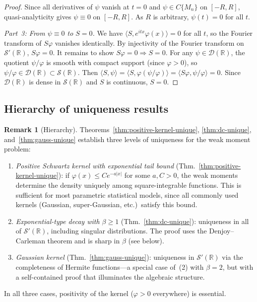 \documentclass[12pt]{article}
\theoremstyle{definition}
\newtheorem{remark}[theorem]{Remark}
\newcommand{\R}{\mathbb{R}}
\begin{document}
\begin{proof}
Since all derivatives of $\psi$ vanish at $t=0$ and $\psi\in C\{M_n\}$ on $[-R,R]$, quasi-analyticity gives $\psi\equiv 0$ on $[-R,R]$.  As $R$ is arbitrary, $\psi(t)=0$ for all $t$.

\medskip
\noindent\textit{Part~3: From $\psi\equiv 0$ to $S = 0$.}
We have $\langle S, e^{itx}\varphi(x)\rangle = 0$ for all $t$, so the Fourier transform of $S\varphi$ vanishes identically.  By injectivity of the Fourier transform on $\mathcal{S}'(\R)$, $S\varphi = 0$.  It remains to show $S\varphi = 0 \Rightarrow S = 0$.  For any $\psi \in \mathcal{D}(\R)$, the quotient $\psi/\varphi$ is smooth with compact support (since $\varphi > 0$), so $\psi/\varphi \in \mathcal{D}(\R) \subset \mathcal{S}(\R)$.  Then $\langle S, \psi\rangle = \langle S, \varphi(\psi/\varphi)\rangle = \langle S\varphi, \psi/\varphi\rangle = 0$.  Since $\mathcal{D}(\R)$ is dense in $\mathcal{S}(\R)$ and $S$ is continuous, $S = 0$.
\end{proof}

\subsection{Hierarchy of uniqueness results}
\label{subsec:hierarchy}

\begin{remark}[Hierarchy]\label{rem:hierarchy}
Theorems~\ref{thm:positive-kernel-unique}, \ref{thm:dc-unique}, and~\ref{thm:gauss-unique} establish three levels of uniqueness for the weak moment problem:
\begin{enumerate}
  \item \emph{Positive Schwartz kernel with exponential tail bound} (Thm.~\ref{thm:positive-kernel-unique}):
    if $\varphi(x)\le Ce^{-a|x|}$ for some $a,C>0$, the weak moments determine the density uniquely among square-integrable functions.  This is sufficient for most parametric statistical models, since all commonly used kernels (Gaussian, super-Gaussian, etc.)\ satisfy this bound.
  \item \emph{Exponential-type decay with $\beta \geq 1$} (Thm.~\ref{thm:dc-unique}):
    uniqueness in all of $\mathcal{S}'(\R)$, including singular distributions.  The proof uses the Denjoy--Carleman theorem and is sharp in $\beta$ (see below).
  \item \emph{Gaussian kernel} (Thm.~\ref{thm:gauss-unique}):
    uniqueness in $\mathcal{S}'(\R)$ via the completeness of Hermite functions---a special case of~(2) with $\beta = 2$, but with a self-contained proof that illuminates the algebraic structure.
\end{enumerate}
In all three cases, positivity of the kernel ($\varphi > 0$ everywhere) is essential.
\end{remark}
\end{document}
